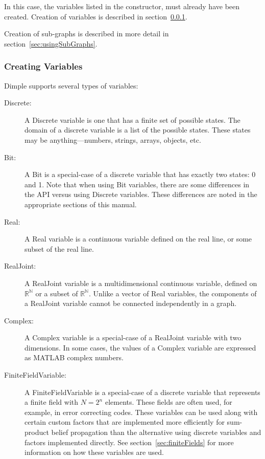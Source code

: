 \fi


In this case, the variables listed in the constructor, must already have been created.  Creation of variables is described in section~\ref{sec:CreatingVariables}.

Creation of sub-graphs is described in more detail in section~\ref{sec:usingSubGraphs}.


\subsubsection{Creating Variables}
\label{sec:CreatingVariables}


Dimple supports several types of variables:

\begin{description}
\item[Discrete:] A Discrete variable is one that has a finite set of possible states.  The domain of a discrete variable is a list of the possible states.  These states may be anything---numbers, strings, arrays, objects, etc.
\item[Bit:] A Bit is a special-case of a discrete variable that has exactly two states: 0 and 1.  Note that when using Bit variables, there are some differences in the API versus using Discrete variables.  These differences are noted in the appropriate sections of this manual.
\item[Real:] A Real variable is a continuous variable defined on the real line, or some subset of the real line.
\item[RealJoint:] A RealJoint variable is a multidimensional continuous variable, defined on $\mathbb{R^{N}}$ or a subset of $\mathbb{R^{N}}$.  Unlike a vector of Real variables, the components of a RealJoint variable cannot be connected independently in a graph.
\item[Complex:] A Complex variable is a special-case of a RealJoint variable with two dimensions. \ifmatlab In some cases, the values of a Complex variable are expressed as MATLAB complex numbers. \fi
\item[FiniteFieldVariable:] A FiniteFieldVariable is a special-case of a discrete variable that represents a finite field with $N=2^{n}$ elements.  These fields are often used, for example, in error correcting codes.  These variables can be used along with certain custom factors that are implemented more efficiently for sum-product belief propagation than the alternative using discrete variables and factors implemented directly.  See section~\ref{sec:finiteFields} for more information on how these variables are used.
\end{description}

